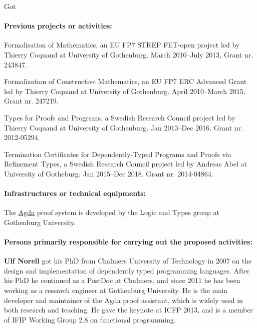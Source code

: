 \begin{sitedescription}{Got}
\paragraph*{Previous projects or activities:}
\begin{compactitem}
\item Formalisation of Mathematics, an EU FP7 STREP FET-open project led by
Thierry Coquand at University of Gothenburg. March 2010--July 2013, Grant
nr. 243847.
\item Formalization of Constructive Mathematics, an EU FP7 ERC Advanced
Grant led by Thierry Coquand at University of Gothenburg. April
2010--March 2015, Grant nr. 247219.
\item Types for Proofs and Programs, a Swedish Research Council project led
by Thierry Coquand at University of Gothenburg. Jan 2013--Dec 2016. Grant
nr. 2012-05294.
\item Termination Certificates for Dependently-Typed Programs and Proofs
via Refinement Types, a Swedish Research Council project led by Andreas
Abel at University of Gotheburg. Jan 2015--Dec 2018. Grant nr. 2014-04864.
\end{compactitem}

\paragraph*{Infrastructures or technical equipments:}
\begin{compactitem}
\item The \href{https://github.com/agda/agda/}{Agda} proof system is developed by the Logic and Types group at
Gothenburg University.
\end{compactitem}

\paragraph*{Persons primarily responsible for carrying out the proposed activities:}

\begin{compactitem}
\item{\bf Ulf Norell} got his PhD from Chalmers University of Technology in
2007 on the design and implementation of dependently typed programming
languages. After his PhD he continued as a PostDoc at Chalmers, and since
2011 he has been working as a research engineer at Gothenburg University.
He is the main developer and maintainer of the Agda proof assistant, which
is widely used in both research and teaching. He gave the keynote at ICFP
2013, and is a member of IFIP Working Group 2.8 on functional programming.
\end{compactitem}

\end{sitedescription}

